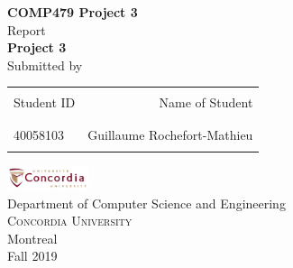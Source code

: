 \begin{titlepage}

    \begin{center}
    
    \textup{\small {\bf COMP479 Project 3} \\ Report}\\[0.2in]
    
    \Large \textbf {Project 3}\\[0.5in]
    
    \normalsize Submitted by \\
    \begin{table}[h]
    \centering
    \begin{tabular}{lr}\hline \\
    Student ID & Name of Student \\ \\ \hline
    \\
    40058103 & Guillaume Rochefort-Mathieu \\ \\ \hline 
    \end{tabular}
    \end{table}
    
    \vfill
    
    \includegraphics[width=0.18\textwidth]{./concordia}\\[0.1in]
    \Large{Department of Computer Science and Engineering}\\
    \normalsize
    \textsc{Concordia University}\\
    Montreal \\
    \vspace{0.2cm}
    Fall 2019
    
    \end{center}
    
    \end{titlepage}